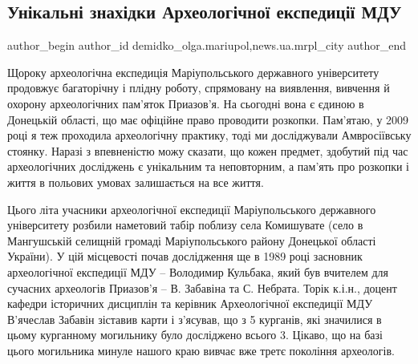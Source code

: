  
 
 
 
 
 
\subsection{Унікальні знахідки Археологічної експедиції МДУ}
\label{sec:16_07_2021.stz.news.ua.mrpl_city.2.znahidky_arheolog_ekspedicii_mdu}
 
\ifcmt
 author_begin
   author_id demidko_olga.mariupol,news.ua.mrpl_city
 author_end
\fi


Щороку археологічна експедиція Маріупольського державного університету
продовжує багаторічну і плідну роботу, спрямовану на виявлення, вивчення й
охорону археологічних пам'яток Приазов'я. На сьогодні вона є єдиною в Донецькій
області, що має офіційне право проводити розкопки. Пам'ятаю, у 2009 році я теж
проходила археологічну практику, тоді ми досліджували Амвросіївську стоянку.
Наразі з впевненістю можу сказати, що кожен предмет, здобутий під час
археологічних досліджень є унікальним та неповторним, а пам'ять про розкопки і
життя в польових умовах залишається на все життя.

Цього літа учасники археологічної експедиції Маріупольського державного
університету розбили наметовий табір поблизу села Комишувате (село в
Мангушській селищній громаді Маріупольського району Донецької області України).
У цій місцевості почав дослідження ще в 1989 році засновник археологічної
експедиції МДУ – Володимир Кульбака, який був вчителем для сучасних археологів
Приазов'я – В. Забавіна та С. Небрата. Торік к.і.н., доцент кафедри історичних
дисциплін та керівник Археологічної експедиції МДУ В'ячеслав Забавін зіставив
карти і з'ясував, що з 5 курганів, які значилися в цьому курганному могильнику
було досліджено всього 3. Цікаво, що на базі цього могильника минуле нашого
краю вивчає вже третє покоління археологів.

